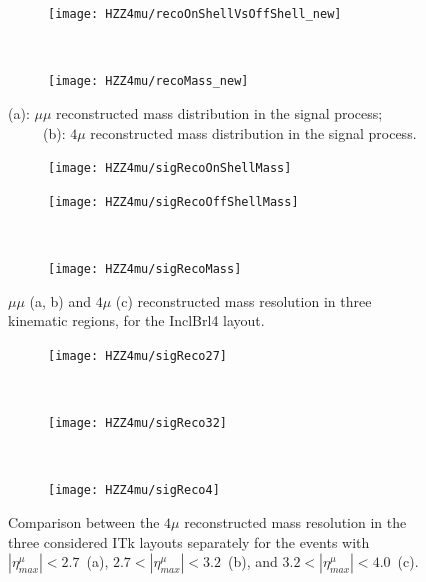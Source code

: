 \documentclass[a4paper,twoside,12pt]{book}
\begin{document}
\begin{figure}
\begin{subfigure}{\linewidth}
\centering
\texttt{[image: HZZ4mu/recoOnShellVsOffShell\_new]}
\caption{}
\label{fig:HZZ4mu:recoOnShellVsOffShell}
\end{subfigure}\\[1ex]
\begin{subfigure}{\linewidth}
\centering
\texttt{[image: HZZ4mu/recoMass\_new]}
\caption{}
\label{fig:HZZ4mu:recoMass}
\end{subfigure}
\caption{(a): $\mu\mu$ reconstructed  mass distribution in the signal process;\\
\ \ \ \ \ (b): $4\mu$ reconstructed mass distribution in the signal process.}
\label{fig:HZZ4mu:recoMasses}
\end{figure}


\begin{figure}
\begin{subfigure}{.5\linewidth}
\texttt{[image: HZZ4mu/sigRecoOnShellMass]}
\caption{}
\label{fig:HZZ4mu:sigRecoOnShellMass}
\end{subfigure}
\begin{subfigure}{.5\linewidth}
\centering
\texttt{[image: HZZ4mu/sigRecoOffShellMass]}
\caption{}
\label{fig:HZZ4mu:sigRecoOffShell}
\end{subfigure}\\[1ex]
\begin{subfigure}{\linewidth}
\centering
\texttt{[image: HZZ4mu/sigRecoMass]}
\caption{}
\label{fig:HZZ4mu:sigRecoMass}
\end{subfigure}
\caption{$\mu\mu$ (a, b) and $4\mu$ (c) reconstructed  mass resolution in three kinematic regions, 
		for the InclBrl4 layout.}
\label{fig:HZZ4mu:massResolution}
\end{figure}

\begin{figure}
\begin{subfigure}{\linewidth}
\centering
\texttt{[image: HZZ4mu/sigReco27]}
\caption{}
\label{fig:HZZ4mu:sigReco27}
\end{subfigure}\\[1ex]
\begin{subfigure}{\linewidth}
\centering
\texttt{[image: HZZ4mu/sigReco32]}
\caption{}
\label{fig:HZZ4mu:sigReco32}
\end{subfigure}\\[1ex]
\begin{subfigure}{\linewidth}
\centering
\texttt{[image: HZZ4mu/sigReco4]}
\caption{}
\label{fig:HZZ4mu:sigReco4}
\end{subfigure}
\caption{Comparison between the $4\mu$ reconstructed mass resolution in the
three considered ITk layouts separately for the events with \mbox{$|\eta^\mu_{max}| < 2.7$ (a)},
	\mbox{$2.7 < |\eta^\mu_{max}| < 3.2$ (b)}, and \mbox{$3.2 < |\eta^\mu_{max}| < 4.0$ (c)}.}
\label{fig:HZZ4mu:layoutMassResolution}
\end{figure}
\end{document}

